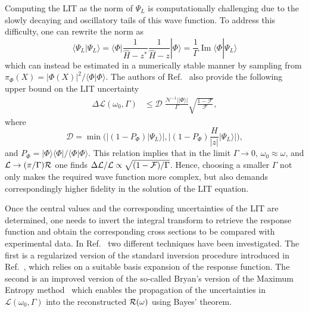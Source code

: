 Computing the LIT as the norm of \(\Psi_L\) is computationally challenging due to the slowly decaying and oscillatory tails of this wave function. To address this difficulty, one can rewrite the norm as  
\begin{equation}
\langle\Psi_{L}|\Psi_{L}\rangle=\langle\Phi|\frac{1}{\hat{H}-z^{*}}\frac{1}{\hat{H}-z}|\Phi\rangle\nonumber=\frac{1}{\Gamma}\operatorname{Im}\langle\Phi | \Psi_{L}\rangle
\label{eq:lit_xilin}
\end{equation}
which can instead be estimated in a numerically stable manner by sampling from \( \pi_\Phi(X) = |\Phi(X)|^2 / \langle \Phi | \Phi \rangle \). 
The authors of Ref.~\cite{parnes_nuclear_2026} also provide the following upper bound on the LIT uncertainty
\begin{align}
\Delta\mathcal{L}(\omega_{0},\Gamma) &\leq 
\mathcal{D} \; \frac{\mathcal{N}^{-1}||\Phi\rangle|}{\Gamma} \sqrt{\frac{1 - \mathcal{F}  }{ \mathcal{F} }},
\label{eq:error}
\end{align}
where
\begin{equation}
    \mathcal{D} = \min\Big(
\left|(1 - P_{\Phi})|\Psi_L\rangle\right|,\Big|(1 - P_{\Phi})  \frac{H}{\left|z\right|}|\Psi_L\rangle\Big|
\Big),
\end{equation}
and $P_\Phi=|\Phi\rangle\langle \Phi|/\langle \Phi|\Phi\rangle$. This relation implies that in the limit $\Gamma\to 0$, $\omega_0\approx\omega$, and
${\cal L} \to (\pi/\Gamma) {\cal R}$ one finds $\Delta {\cal L}/{\cal L} \propto \sqrt{(1-{\cal F})/\Gamma}$.
Hence, choosing a smaller $\Gamma$ not only makes the required wave function more complex, but also demands correspondingly higher fidelity in the solution of the LIT equation.

Once the central values and the corresponding uncertainties of the LIT are determined, one needs to invert the 
integral transform to retrieve the response function and obtain the corresponding cross sections to be compared with experimental data. In Ref.~\cite{parnes_nuclear_2026} two different techniques have been investigated. The first is a regularized version of the standard inversion procedure introduced in Ref.~\cite{efros_lorentz_2007}, which relies on a suitable basis expansion of the response function. The second is an improved version of the so-called Bryan's version of the Maximum Entropy method~\cite{jarrell_bayesian_1996} which enables the propagation of the uncertainties in $\mathcal{L}(\omega_0, \Gamma)$ into the reconstructed ${\cal R}(\omega)$ using Bayes' theorem.  

